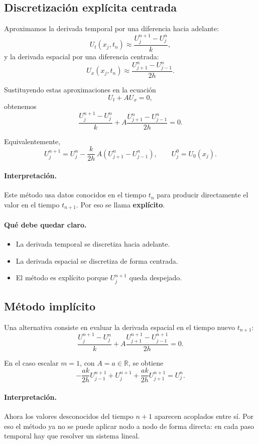 \subsection{Discretización explícita centrada}

Aproximamos la derivada temporal por una diferencia hacia adelante:
\[
U_t(x_j,t_n)\approx \frac{U_j^{n+1}-U_j^n}{k},
\]
y la derivada espacial por una diferencia centrada:
\[
U_x(x_j,t_n)\approx \frac{U_{j+1}^n-U_{j-1}^n}{2h}.
\]

Sustituyendo estas aproximaciones en la ecuación
\[
U_t + A U_x =0,
\]
obtenemos
\[
\frac{U_j^{n+1}-U_j^n}{k}
+
A\frac{U_{j+1}^n-U_{j-1}^n}{2h}
=0.
\]

Equivalentemente,
\[
U_j^{n+1}
=
U_j^n
-
\frac{k}{2h}\,A\left(U_{j+1}^n-U_{j-1}^n\right),
\qquad
U_j^0=U_0(x_j).
\]

\paragraph{Interpretación.}
Este método usa datos conocidos en el tiempo \(t_n\) para producir directamente el valor en el tiempo \(t_{n+1}\). Por eso se llama \textbf{explícito}.

\paragraph{Qué debe quedar claro.}
\begin{itemize}
    \item La derivada temporal se discretiza hacia adelante.
    \item La derivada espacial se discretiza de forma centrada.
    \item El método es explícito porque \(U_j^{n+1}\) queda despejado.
\end{itemize}

\subsection{Método implícito}

Una alternativa consiste en evaluar la derivada espacial en el tiempo nuevo \(t_{n+1}\):
\[
\frac{U_j^{n+1}-U_j^n}{k}
+
A\frac{U_{j+1}^{n+1}-U_{j-1}^{n+1}}{2h}
=0.
\]

En el caso escalar \(m=1\), con \(A=a\in\mathbb{R}\), se obtiene
\[
-\frac{ak}{2h}U_{j-1}^{n+1}
+
U_j^{n+1}
+
\frac{ak}{2h}U_{j+1}^{n+1}
=
U_j^n.
\]

\paragraph{Interpretación.}
Ahora los valores desconocidos del tiempo \(n+1\) aparecen acoplados entre sí. Por eso el método ya no se puede aplicar nodo a nodo de forma directa: en cada paso temporal hay que resolver un sistema lineal.

